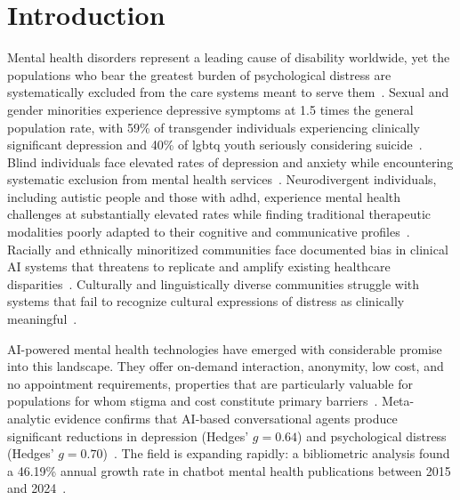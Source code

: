 \section{Introduction}

Mental health disorders represent a leading cause of disability worldwide, yet the populations who bear the greatest burden of psychological distress are systematically excluded from the care systems meant to serve them~\cite{casu_2024}. Sexual and gender minorities experience depressive symptoms at 1.5 times the general population rate, with 59\% of transgender individuals experiencing clinically significant depression and 40\% of \gls{lgbtq} youth seriously considering suicide~\cite{liu_2023}. Blind individuals face elevated rates of depression and anxiety while encountering systematic exclusion from mental health services~\cite{khan_seo_2025}. Neurodivergent individuals, including autistic people and those with \gls{adhd}, experience mental health challenges at substantially elevated rates while finding traditional therapeutic modalities poorly adapted to their cognitive and communicative profiles~\cite{papadopoulos_2025}. Racially and ethnically minoritized communities face documented bias in clinical AI systems that threatens to replicate and amplify existing healthcare disparities~\cite{timmons_2023,haider_2024}. Culturally and linguistically diverse communities struggle with systems that fail to recognize cultural expressions of distress as clinically meaningful~\cite{soubutts_2024}.

AI-powered mental health technologies have emerged with considerable promise into this landscape. They offer on-demand interaction, anonymity, low cost, and no appointment requirements, properties that are particularly valuable for populations for whom stigma and cost constitute primary barriers~\cite{li_2023,drydakis_2022}. Meta-analytic evidence confirms that AI-based conversational agents produce significant reductions in depression (Hedges' $g = 0.64$) and psychological distress (Hedges' $g = 0.70$)~\cite{li_2023,abd_alrazaq_2020}. The field is expanding rapidly: a bibliometric analysis found a 46.19\% annual growth rate in chatbot mental health publications between 2015 and 2024~\cite{zhang_bibliometric_2025}.


